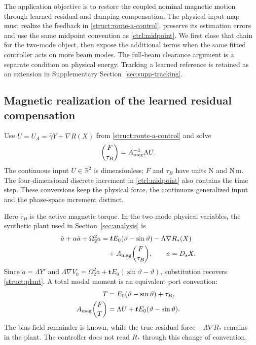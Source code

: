 The application objective is to restore the coupled nominal magnetic
motion through learned residual and damping compensation. The physical
input map must realize the feedback in
\eqref{struct:route-a-control}, preserve its estimation errors and use
the same midpoint convention as \eqref{ctrl:midpoint}. We first close
that chain for the two-mode object, then expose the additional terms
when the same fitted controller acts on more beam modes. The
full-beam clearance argument is a separate condition on physical
energy. Tracking a learned reference is retained as an extension in
Supplementary Section~\ref{sec:supp-tracking}.

\subsection{Magnetic realization of the learned residual compensation}
\label{app:ports}
Use $U=U_A=\widehat\gamma Y+\nabla\widehat R(X)$ from
\eqref{struct:route-a-control} and solve
\begin{equation}
 \binom{F}{\tau_B}=A_{\rm mag}^{-1}\Lambda U.
 \label{app:port-inverse}
\end{equation}
The continuous input $U\in\mathbb R^2$ is dimensionless; $F$ and
$\tau_B$ have units N and N\,m. The four-dimensional discrete increment
in \eqref{ctrl:midpoint} also contains the time step. These conversions
keep the physical force, the continuous generalized input and the
phase-space increment distinct.

Here $\tau_B$ is the active magnetic torque. In the two-mode physical
variables, the synthetic plant used in Section~\ref{sec:analysis} is
\begin{align}
 \ddot a+\alpha\dot a+\Omega_2^2a
 &=\boldsymbol t E_0(\vartheta-\sin\vartheta)
       -\Lambda\nabla R_*(X)\nonumber\\
 &\quad+A_{\rm mag}\binom{F}{\tau_B},
 \qquad a=D_sX.
 \label{app:residual-plant}
\end{align}
Since $\ddot a=\Lambda Y'$ and
$\Lambda\nabla V_0=\Omega_2^2a+\boldsymbol tE_0(\sin\vartheta-\vartheta)$,
substitution recovers \eqref{struct:plant}. A total modal moment is an
equivalent port convention:
\begin{align}
 T&=E_0(\vartheta-\sin\vartheta)+\tau_B,\nonumber\\
 A_{\rm mag}\binom{F}{T}
 &=\Lambda U+\boldsymbol tE_0(\vartheta-\sin\vartheta).
 \label{app:total-port}
\end{align}
The bias-field remainder is known, while the true residual force
$-\Lambda\nabla R_*$ remains in the plant. The controller does not
read $R_*$ through this change of convention.

